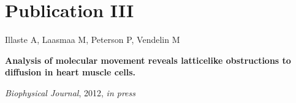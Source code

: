 \chapter*{Publication III}
\addtocounter{chapter}{1}
\label{pubIIIpage}
\vfill 
Illaste A, Laasmaa M, Peterson P, Vendelin M

{\bf Analysis of molecular movement reveals latticelike obstructions to
diffusion in heart muscle cells.}

\emph{Biophysical Journal}, 2012, \emph{in press}
\vfill 
\pagebreak
\vspace*{3cm}\thispagestyle{empty}
\pagebreak

\renewcommand{\thepaper}{\PaperIII}

